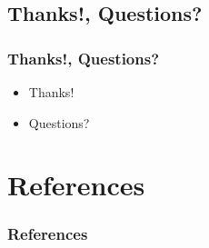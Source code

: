 \documentclass[mathserif,xcolor=dvipsnames,hyperref={bookmarks=true}]{beamer}
\begin{document}
    \subsection{Thanks!, Questions?}
    \begin{frame}[t]
        \frametitle{Thanks!, Questions?}
        \begin{itemize}
            \item<2-> Thanks!
            \item<3-> Questions?
        \end{itemize}
    \end{frame}

\section*{References}
\begin{frame}[t]
    \frametitle{References}
\end{frame}

\end{document}
